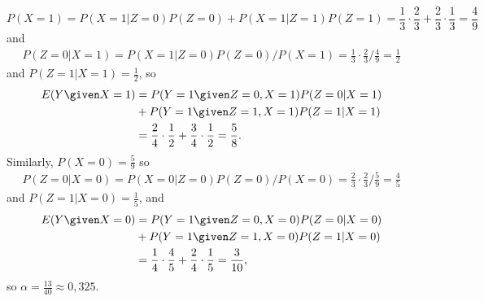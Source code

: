 \begin{enumerate}[label=7.\arabic*]
\begin{ungradedsolution}
\begin{enumerate}
            $$P(X=1) = P(X=1 | Z=0)P(Z=0) + P(X=1 | Z=1)P(Z=1) = \frac{1}{3}\cdot\frac{2}{3} + \frac{2}{3}\cdot\frac{1}{3} = \frac{4}{9}$$
            and
            \begin{align*}
                P(Z=0 | X=1) = P(X=1 | Z=0)P(Z=0)/P(X=1) = \frac{1}{3}\cdot\frac{2}{3} / \frac{4}{9} = \frac{1}{2}
            \end{align*}
            and $P(Z=1 | X=1) = \frac{1}{2}$, so
            \begin{align*}
                E(Y \given X=1) & = P(Y=1 \given Z=0, X=1)P(Z=0|X=1)                                         \\
                                & + P(Y=1 \given Z=1, X=1)P(Z=1|X=1)                                         \\
                                & = \frac{2}{4}\cdot\frac{1}{2} + \frac{3}{4}\cdot\frac{1}{2} = \frac{5}{8}.
            \end{align*}
            Similarly, $P(X=0) = \frac{5}{9}$ so
            \begin{align*}
                P(Z=0 | X=0) = P(X=0 | Z=0)P(Z=0)/P(X=0) = \frac{2}{3}\cdot\frac{2}{3} / \frac{5}{9} = \frac{4}{5}
            \end{align*}
            and $P(Z=1 | X=0) = \frac{1}{5}$, and
            \begin{align*}
                E(Y \given X=0) & = P(Y=1 \given Z=0, X=0)P(Z=0|X=0)                                          \\
                                & + P(Y=1 \given Z=1, X=0)P(Z=1|X=0)                                          \\
                                & = \frac{1}{4}\cdot\frac{4}{5} + \frac{2}{4}\cdot\frac{1}{5} = \frac{3}{10},
            \end{align*}
            so $\alpha = \frac{13}{40}\approx 0,325$.



\end{enumerate}
\end{ungradedsolution}
\end{enumerate}
